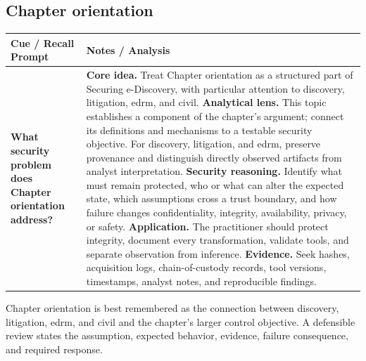 \documentclass[11pt]{article}
\newcommand{\CornellHeader}{%
\rowcolor{Navy}\color{white}\bfseries Cue / Recall Prompt & \color{white}\bfseries Notes / Analysis\\\hline}
\newcommand{\CornellRow}[2]{%
\cellcolor{CueGray}\RaggedRight\textbf{#1} & \RaggedRight #2\\\hline}
\begin{document}
\subsection*{Chapter orientation}
\begin{longtable}{>{\RaggedRight\arraybackslash}p{}|>{\RaggedRight\arraybackslash}p{}}
\CornellHeader
\CornellRow{What security problem does Chapter orientation address?}{\textbf{Core idea.} Treat Chapter orientation as a structured part of Securing e-Discovery, with particular attention to discovery, litigation, edrm, and civil. \textbf{Analytical lens.} This topic establishes a component of the chapter's argument; connect its definitions and mechanisms to a testable security objective. For discovery, litigation, and edrm, preserve provenance and distinguish directly observed artifacts from analyst interpretation. \textbf{Security reasoning.} Identify what must remain protected, who or what can alter the expected state, which assumptions cross a trust boundary, and how failure changes confidentiality, integrity, availability, privacy, or safety. \textbf{Application.} The practitioner should protect integrity, document every transformation, validate tools, and separate observation from inference. \textbf{Evidence.} Seek hashes, acquisition logs, chain-of-custody records, tool versions, timestamps, analyst notes, and reproducible findings.}
\end{longtable}
\begin{topicsummary}
Chapter orientation is best remembered as the connection between discovery, litigation, edrm, and civil and the chapter's larger control objective. A defensible review states the assumption, expected behavior, evidence, failure consequence, and required response.
\end{topicsummary}
\end{document}
